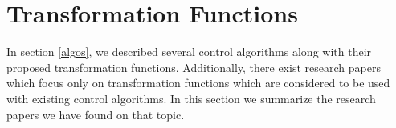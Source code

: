 \documentclass[11pt,a4paper]{article}
\begin{document}















\newpage



\newpage

\section{Transformation Functions}
In section \ref{algos}, we described several control algorithms along with their proposed transformation functions. Additionally, there exist research papers which focus only on transformation functions which are considered to be used with existing control algorithms. In this section we summarize the research papers we have found on that topic.





\newpage



\newpage

\end{document}
